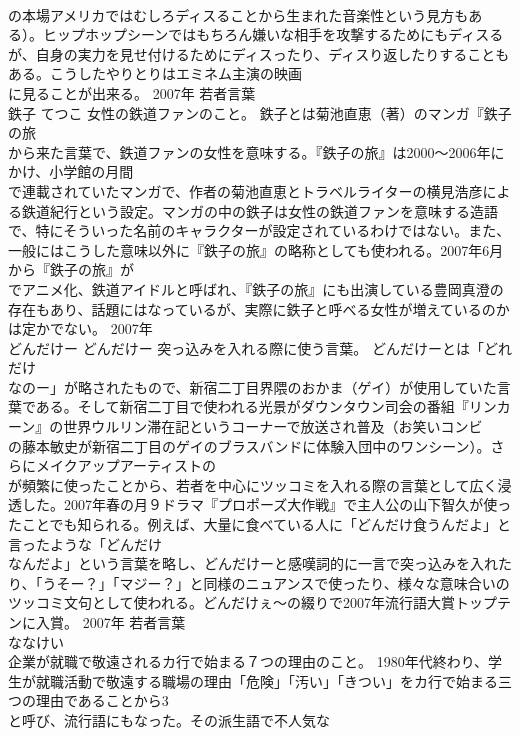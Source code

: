 \documentclass[8pt]{extreport}
\begin{document}
\begin{CJK}{UTF8}{min}
\\	の本場アメリカではむしろディスることから生まれた音楽性という見方もある）。ヒップホップシーンではもちろん嫌いな相手を攻撃するためにもディスるが、自身の実力を見せ付けるためにディスったり、ディスり返したりすることもある。こうしたやりとりはエミネム主演の映画
\\	に見ることが出来る。	2007年	若者言葉	
\\	鉄子	てつこ	女性の鉄道ファンのこと。	鉄子とは菊池直恵（著）のマンガ『鉄子の旅 
\\	から来た言葉で、鉄道ファンの女性を意味する。『鉄子の旅』は2000～2006年にかけ、小学館の月間
\\	で連載されていたマンガで、作者の菊池直恵とトラベルライターの横見浩彦による鉄道紀行という設定。マンガの中の鉄子は女性の鉄道ファンを意味する造語で、特にそういった名前のキャラクターが設定されているわけではない。また、一般にはこうした意味以外に『鉄子の旅』の略称としても使われる。2007年6月から『鉄子の旅』が
\\	でアニメ化、鉄道アイドルと呼ばれ、『鉄子の旅』にも出演している豊岡真澄の存在もあり、話題にはなっているが、実際に鉄子と呼べる女性が増えているのかは定かでない。	2007年	
\\	どんだけー	どんだけー	突っ込みを入れる際に使う言葉。	どんだけーとは「どれだけ
\\	なのー」が略されたもので、新宿二丁目界隈のおかま（ゲイ）が使用していた言葉である。そして新宿二丁目で使われる光景がダウンタウン司会の番組『リンカーン』の世界ウルリン滞在記というコーナーで放送され普及（お笑いコンビ
\\	の藤本敏史が新宿二丁目のゲイのブラスバンドに体験入団中のワンシーン）。さらにメイクアップアーティストの
\\	が頻繁に使ったことから、若者を中心にツッコミを入れる際の言葉として広く浸透した。2007年春の月９ドラマ『プロポーズ大作戦』で主人公の山下智久が使ったことでも知られる。例えば、大量に食べている人に「どんだけ食うんだよ」と言ったような「どんだけ
\\	なんだよ」という言葉を略し、どんだけーと感嘆詞的に一言で突っ込みを入れたり、「うそー？」「マジー？」と同様のニュアンスで使ったり、様々な意味合いのツッコミ文句として使われる。どんだけぇ～の綴りで2007年流行語大賞トップテンに入賞。	2007年	若者言葉	
\\	ななけい	
\\	企業が就職で敬遠されるカ行で始まる７つの理由のこと。	1980年代終わり、学生が就職活動で敬遠する職場の理由「危険」「汚い」「きつい」をカ行で始まる三つの理由であることから3
\\	と呼び、流行語にもなった。その派生語で不人気な

\end{CJK}
\end{document}
